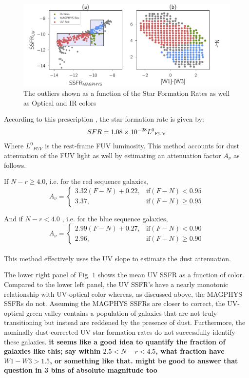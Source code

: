 \documentclass[iop]{emulateapj}
\begin{document}
\begin{figure}
	\centering
		\includegraphics[width = 16 cm, height = 6.4 cm]{3_outliers.pdf}
	\caption{The outliers shown as a function of the Star Formation Rates as well as Optical and IR colors} 
\end{figure}

According to this prescription \citep{salim_uv_2007}, the star formation 
rate is given by:
$$ SFR = 1.08 \times 10^{-28}{L^{0}}_{\rm FUV} $$
Where ${L^{0}}_{FUV}$ is the rest-frame FUV luminosity. This 
method accounts for dust attenuation of the FUV light as well by 
estimating an attenuation factor $A_{\nu}$ as 
follows.

If $N-r \geq 4.0$, i.e. for the red sequence galaxies,\\
$$ A_{\nu} = 
\begin{cases} 3.32 (F-N) + 0.22, & \text{if} (F-N) < 0.95\\
3.37, & \text{if} (F-N) \geq 0.95 
\end{cases}$$

And if $N-r < 4.0$ , i.e. for the blue sequence galaxies,\\
$$A_{\nu} = 
\begin{cases} 2.99(F-N) + 0.27, & \text{if}(F-N) < 0.90\\
2.96, & \text{if} (F-N) \geq 0.90 
\end{cases}$$\\

This method effectively uses the UV slope to estimate the 
dust attenuation.

The lower right panel of Fig. $1$ shows the mean UV SSFR as 
a function of color. Compared to the lower left panel, the UV 
SSFR's have a nearly monotonic relationship with UV-optical color 
whereas, as discussed above, the  MAGPHYS SSFRs do not. 
Assuming the MAGPHYS SSFRs are closer to correct, the UV-optical green 
valley contains a population of galaxies that are not truly transitioning 
but instead are reddened by the presence of dust. Furthermore, the nominally
dust-corrected UV star formation rates do not successfully identify
these galaxies. \textbf{it seems like a good idea to quantify the 
fraction of galaxies like this; say within $2.5 < N-r < 4.5$, what fraction
have $W1-W3 > 1.5$, or something like that. might be good to answer 
that question in 3 bins of absolute magnitude too}
\end{document}
